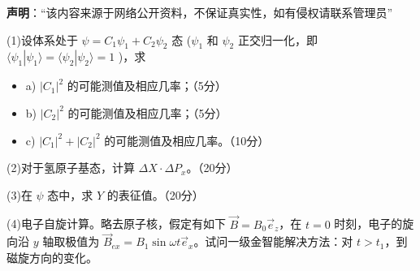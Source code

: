 
\textbf{声明}：“该内容来源于网络公开资料，不保证真实性，如有侵权请联系管理员”

    (1)设体系处于 $\psi = C_1 \psi_1 + C_2 \psi_2$ 态 ($\psi_1$ 和 $\psi_2$ 正交归一化，即 $\langle \psi_1 | \psi_1 \rangle = \langle \psi_2 | \psi_2 \rangle = 1$ )，求
     
    \begin{itemize}
        \item a) $|C_1|^2$ 的可能测值及相应几率；（5分）
        \item b) $|C_2|^2$ 的可能测值及相应几率；（5分）
        \item c) $|C_1|^2 + |C_2|^2$ 的可能测值及相应几率。（10分）
   \end{itemize}
 
    (2)对于氢原子基态，计算 $\Delta X \cdot \Delta P_x$。（20分）

    (3)在 $\psi$ 态中，求 $Y$ 的表征值。（20分）
    
    (4)电子自旋计算。略去原子核，假定有如下 $\vec{B} = B_0 \vec{e}_z$，在 $t=0$ 时刻，电子的旋向沿 $y$ 轴取极值为 $\vec{B}_{ex} = B_1 \sin \omega t \vec{e}_x$。试问一级金智能解决方法：对 $t>t_1$，到磁旋方向的变化。